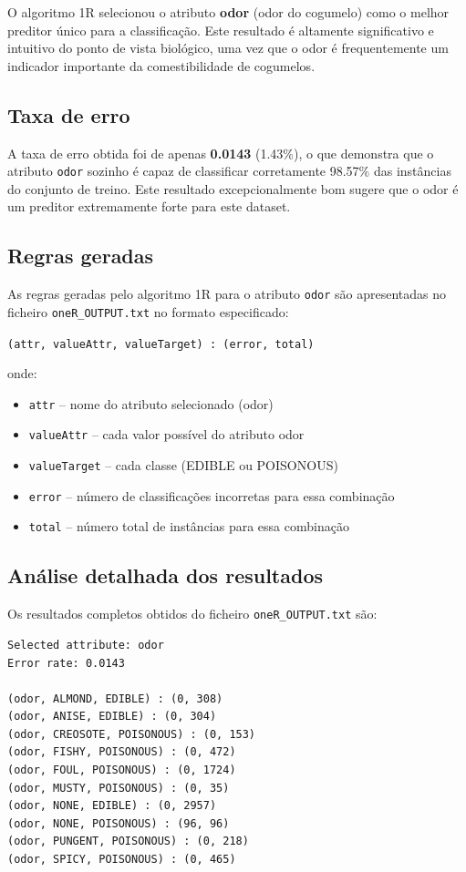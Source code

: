 \documentclass[12pt,a4paper]{article}
\begin{document}
O algoritmo 1R selecionou o atributo \textbf{odor} (odor do cogumelo) como o melhor preditor único para a classificação. Este resultado é altamente significativo e intuitivo do ponto de vista biológico, uma vez que o odor é frequentemente um indicador importante da comestibilidade de cogumelos.

\subsection{Taxa de erro}

A taxa de erro obtida foi de apenas \textbf{0.0143} (1.43\%), o que demonstra que o atributo \texttt{odor} sozinho é capaz de classificar corretamente 98.57\% das instâncias do conjunto de treino. Este resultado excepcionalmente bom sugere que o odor é um preditor extremamente forte para este dataset.

\subsection{Regras geradas}

As regras geradas pelo algoritmo 1R para o atributo \texttt{odor} são apresentadas no ficheiro \texttt{oneR\_OUTPUT.txt} no formato especificado:

\texttt{(attr, valueAttr, valueTarget) : (error, total)}

\noindent onde:
\begin{itemize}
    \item \texttt{attr} -- nome do atributo selecionado (odor)
    \item \texttt{valueAttr} -- cada valor possível do atributo odor
    \item \texttt{valueTarget} -- cada classe (EDIBLE ou POISONOUS)
    \item \texttt{error} -- número de classificações incorretas para essa combinação
    \item \texttt{total} -- número total de instâncias para essa combinação
\end{itemize}

\subsection{Análise detalhada dos resultados}

Os resultados completos obtidos do ficheiro \texttt{oneR\_OUTPUT.txt} são:

\begin{verbatim}
Selected attribute: odor
Error rate: 0.0143

(odor, ALMOND, EDIBLE) : (0, 308)
(odor, ANISE, EDIBLE) : (0, 304)
(odor, CREOSOTE, POISONOUS) : (0, 153)
(odor, FISHY, POISONOUS) : (0, 472)
(odor, FOUL, POISONOUS) : (0, 1724)
(odor, MUSTY, POISONOUS) : (0, 35)
(odor, NONE, EDIBLE) : (0, 2957)
(odor, NONE, POISONOUS) : (96, 96)
(odor, PUNGENT, POISONOUS) : (0, 218)
(odor, SPICY, POISONOUS) : (0, 465)
\end{verbatim}
\end{document}
